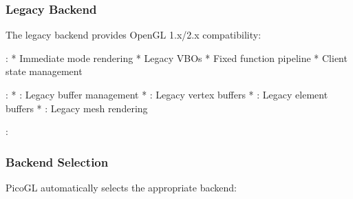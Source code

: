 \documentclass[a4paper,10pt,english,openany,oneside]{sphinxmanual}
\begin{document}
\subsubsection{Legacy Backend}
\label{\detokenize{development:legacy-backend}}
\sphinxAtStartPar
The legacy backend provides OpenGL 1.x/2.x compatibility:

\sphinxAtStartPar
{}:
* Immediate mode rendering
* Legacy VBOs
* Fixed function pipeline
* Client state management

\sphinxAtStartPar
{}:
* : Legacy buffer management
* : Legacy vertex buffers
* : Legacy element buffers
* : Legacy mesh rendering

\sphinxAtStartPar
{}:

\begin{sphinxVerbatim}[commandchars=\\\{\}]
 

  
  
  

\end{sphinxVerbatim}


\subsubsection{Backend Selection}
\label{\detokenize{development:backend-selection}}
\sphinxAtStartPar
PicoGL automatically selects the appropriate backend:
\end{document}
